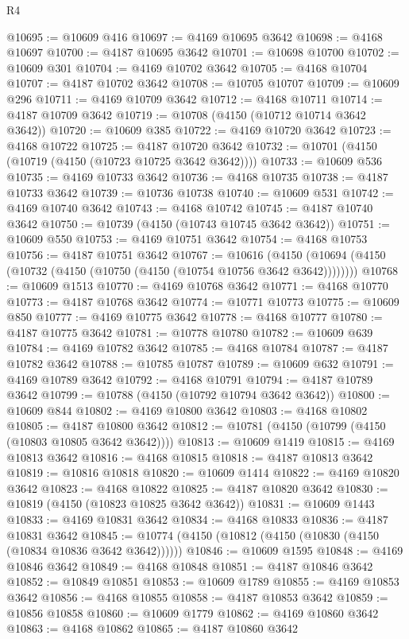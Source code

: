 \begin{lexlean}{R4}
\begin{coremodule}
@10695 := @10609 @416
@10697 := @4169 @10695 @3642
@10698 := @4168 @10697
@10700 := @4187 @10695 @3642
@10701 := @10698 @10700
@10702 := @10609 @301
@10704 := @4169 @10702 @3642
@10705 := @4168 @10704
@10707 := @4187 @10702 @3642
@10708 := @10705 @10707
@10709 := @10609 @296
@10711 := @4169 @10709 @3642
@10712 := @4168 @10711
@10714 := @4187 @10709 @3642
@10719 := @10708 (@4150 (@10712 @10714 @3642 @3642))
@10720 := @10609 @385
@10722 := @4169 @10720 @3642
@10723 := @4168 @10722
@10725 := @4187 @10720 @3642
@10732 := @10701 (@4150 (@10719 (@4150 (@10723 @10725 @3642 @3642))))
@10733 := @10609 @536
@10735 := @4169 @10733 @3642
@10736 := @4168 @10735
@10738 := @4187 @10733 @3642
@10739 := @10736 @10738
@10740 := @10609 @531
@10742 := @4169 @10740 @3642
@10743 := @4168 @10742
@10745 := @4187 @10740 @3642
@10750 := @10739 (@4150 (@10743 @10745 @3642 @3642))
@10751 := @10609 @550
@10753 := @4169 @10751 @3642
@10754 := @4168 @10753
@10756 := @4187 @10751 @3642
@10767 := @10616
    (@4150 (@10694 (@4150 (@10732 (@4150 (@10750 (@4150 (@10754 @10756 @3642 @3642))))))))
@10768 := @10609 @1513
@10770 := @4169 @10768 @3642
@10771 := @4168 @10770
@10773 := @4187 @10768 @3642
@10774 := @10771 @10773
@10775 := @10609 @850
@10777 := @4169 @10775 @3642
@10778 := @4168 @10777
@10780 := @4187 @10775 @3642
@10781 := @10778 @10780
@10782 := @10609 @639
@10784 := @4169 @10782 @3642
@10785 := @4168 @10784
@10787 := @4187 @10782 @3642
@10788 := @10785 @10787
@10789 := @10609 @632
@10791 := @4169 @10789 @3642
@10792 := @4168 @10791
@10794 := @4187 @10789 @3642
@10799 := @10788 (@4150 (@10792 @10794 @3642 @3642))
@10800 := @10609 @844
@10802 := @4169 @10800 @3642
@10803 := @4168 @10802
@10805 := @4187 @10800 @3642
@10812 := @10781 (@4150 (@10799 (@4150 (@10803 @10805 @3642 @3642))))
@10813 := @10609 @1419
@10815 := @4169 @10813 @3642
@10816 := @4168 @10815
@10818 := @4187 @10813 @3642
@10819 := @10816 @10818
@10820 := @10609 @1414
@10822 := @4169 @10820 @3642
@10823 := @4168 @10822
@10825 := @4187 @10820 @3642
@10830 := @10819 (@4150 (@10823 @10825 @3642 @3642))
@10831 := @10609 @1443
@10833 := @4169 @10831 @3642
@10834 := @4168 @10833
@10836 := @4187 @10831 @3642
@10845 := @10774 (@4150 (@10812 (@4150 (@10830 (@4150 (@10834 @10836 @3642 @3642))))))
@10846 := @10609 @1595
@10848 := @4169 @10846 @3642
@10849 := @4168 @10848
@10851 := @4187 @10846 @3642
@10852 := @10849 @10851
@10853 := @10609 @1789
@10855 := @4169 @10853 @3642
@10856 := @4168 @10855
@10858 := @4187 @10853 @3642
@10859 := @10856 @10858
@10860 := @10609 @1779
@10862 := @4169 @10860 @3642
@10863 := @4168 @10862
@10865 := @4187 @10860 @3642

\end{coremodule}
\end{lexlean}
